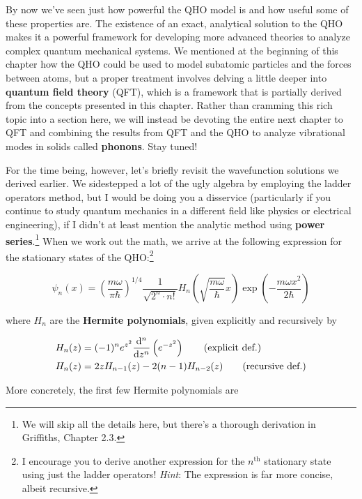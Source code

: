 By now we've seen just how powerful the QHO model is and how useful some of these properties are. 
The existence of an exact, analytical solution to the QHO makes it a powerful framework for developing more advanced theories to analyze complex quantum mechanical systems. 
We mentioned at the beginning of this chapter how the QHO could be used to model subatomic particles and the forces between atoms, but a proper treatment involves delving a little deeper into \textbf{quantum field theory} (QFT), which is a framework that is partially derived from the concepts presented in this chapter. 
Rather than cramming this rich topic into a section here, we will instead be devoting the entire next chapter to QFT and combining the results from QFT and the QHO to analyze vibrational modes in solids called \textbf{phonons}. 
Stay tuned!

For the time being, however, let's briefly revisit the wavefunction solutions we derived earlier. 
We sidestepped a lot of the ugly algebra by employing the ladder operators method, but I would be doing you a disservice (particularly if you continue to study quantum mechanics in a different field like physics or electrical engineering), if I didn't at least mention the analytic method using \textbf{power series}.\footnote{We will skip all the details here, but there's a thorough derivation in Griffiths, Chapter 2.3.} 
When we work out the math, we arrive at the following expression for the stationary states of the QHO:\footnote{I encourage you to derive another expression for the $n^{\text{th}}$ stationary state using just the ladder operators! \emph{Hint}: The expression is far more concise, albeit recursive.} 

\begin{equation}
	\psi_n(x) = \left(\frac{m\omega}{\pi\hbar}\right)^{1/4} \frac{1}{\sqrt{2^n \cdot n!}} H_n \left(\sqrt{\frac{m\omega}{\hbar}}x\right) \exp \left(-\frac{m\omega x^2}{2\hbar}\right) \label{eq:pow-qho}
\end{equation}

\noindent where $H_n$ are the \textbf{Hermite polynomials}, given explicitly and recursively by

\begin{align*}
	H_n(z) &= (-1)^n e^{z^2} \dv[n]{z} \left( e^{-z^2} \right) \tag{explicit def.} \\
	H_n(z) &= 2zH_{n-1}(z) - 2(n-1)H_{n-2}(z) \tag{recursive def.}
\end{align*}

More concretely, the first few Hermite polynomials are

